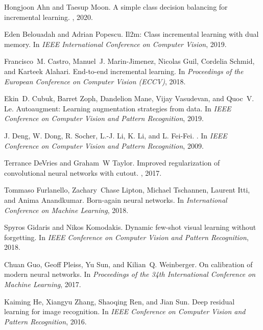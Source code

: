 \documentclass[final]{cvpr}
\begin{document}
\begin{thebibliography}{10}\itemsep=-1pt

Hongjoon Ahn and Taesup Moon.
\newblock A simple class decision balancing for incremental learning.
, 2020.

Eden Belouadah and Adrian Popescu.
\newblock Il2m: Class incremental learning with dual memory.
\newblock In {\em IEEE International Conference on Computer Vision}, 2019.

Francisco~M. Castro, Manuel~J. Marin-Jimenez, Nicolas Guil, Cordelia Schmid,
  and Karteek Alahari.
\newblock End-to-end incremental learning.
\newblock In {\em Proceedings of the European Conference on Computer Vision
  (ECCV)}, 2018.

Ekin~D. Cubuk, Barret Zoph, Dandelion Mane, Vijay Vasudevan, and Quoc~V. Le.
\newblock Autoaugment: Learning augmentation strategies from data.
\newblock In {\em IEEE Conference on Computer Vision and Pattern Recognition},
  2019.

J. Deng, W. Dong, R. Socher, L.-J. Li, K. Li, and L. Fei-Fei.
.
\newblock In {\em IEEE Conference on Computer Vision and Pattern Recognition},
  2009.

Terrance DeVries and Graham~W Taylor.
\newblock Improved regularization of convolutional neural networks with cutout.
, 2017.

Tommaso Furlanello, Zachary~Chase Lipton, Michael Tschannen, Laurent Itti, and
  Anima Anandkumar.
\newblock Born-again neural networks.
\newblock In {\em International Conference on Machine Learning}, 2018.

Spyros Gidaris and Nikos Komodakis.
\newblock Dynamic few-shot visual learning without forgetting.
\newblock In {\em IEEE Conference on Computer Vision and Pattern Recognition},
  2018.

Chuan Guo, Geoff Pleiss, Yu Sun, and Kilian~Q. Weinberger.
\newblock On calibration of modern neural networks.
\newblock In {\em Proceedings of the 34th International Conference on Machine
  Learning}, 2017.

Kaiming He, Xiangyu Zhang, Shaoqing Ren, and Jian Sun.
\newblock Deep residual learning for image recognition.
\newblock In {\em IEEE Conference on Computer Vision and Pattern Recognition},
  2016.


\end{thebibliography}
\end{document}
